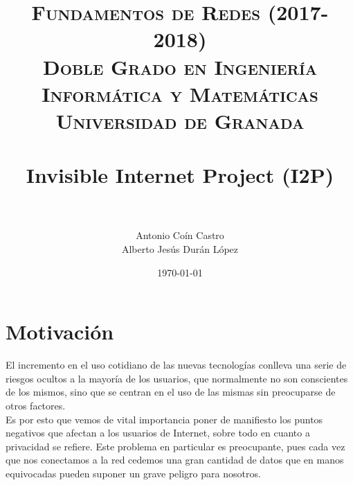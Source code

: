 

\title{	
	\normalfont \normalsize 
	\textsc{\textbf{Fundamentos de Redes (2017-2018)} \\ Doble Grado en Ingeniería Informática y Matemáticas \\ Universidad de Granada} \\ [25pt] 
	\horrule{0.5pt} \\[0.4cm]
	\huge Invisible Internet Project (I2P) \\ 
	\horrule{2pt} \\[0.5cm] 
}

\author{Antonio Coín Castro \\ Alberto Jesús Durán López} 
\date{\normalsize\today}



	\maketitle       %
	\newpage 
	\tableofcontents %
	\newpage
	
	
	
	
	\section{Motivación}
	
	El incremento en el uso cotidiano de las nuevas tecnologías conlleva una serie de riesgos ocultos a la mayoría de los usuarios, que normalmente no son conscientes de los mismos, sino que se centran en el uso de las mismas sin preocuparse de otros factores.\\
	
	Es por esto que vemos de vital importancia poner de manifiesto los puntos negativos que afectan a los usuarios de Internet, sobre todo en cuanto a privacidad se refiere. Este problema en particular es preocupante, pues cada vez que nos conectamos a la red cedemos una gran cantidad de datos que en manos equivocadas pueden suponer un grave peligro para nosotros.\\
	

